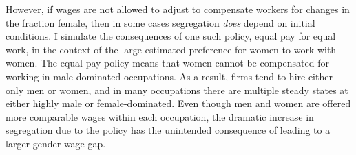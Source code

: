 \documentclass[12pt]{article}
\begin{document}

However, if wages are not allowed to adjust to compensate workers for changes in the fraction female, then in some cases segregation \textit{does} depend on initial conditions. I simulate the consequences of one such policy, equal pay for equal work, in the context of the large estimated preference for women to work with women. The equal pay policy means that women cannot be compensated for working in male-dominated occupations. As a result, firms tend to hire either only men or women, and in many occupations there are multiple steady states at either highly male or female-dominated. Even though men and women are offered more comparable wages within each occupation, the dramatic increase in segregation due to the policy has the unintended consequence of leading to a larger gender wage gap.




\end{document}
